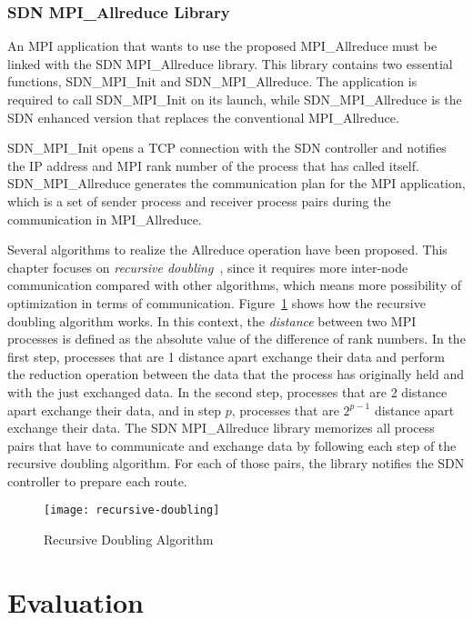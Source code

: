 \subsubsection{SDN MPI\_Allreduce Library}

An MPI application that wants to use the proposed MPI\_Allreduce must be
linked with the SDN MPI\_Allreduce library. This library contains two
essential functions, SDN\_MPI\_Init and SDN\_MPI\_Allreduce. The application
is required to call SDN\_MPI\_Init on its launch, while SDN\_MPI\_Allreduce is
the SDN enhanced version that replaces the conventional MPI\_Allreduce.

SDN\_MPI\_Init opens a TCP connection with the SDN controller and notifies the
IP address and MPI rank number of the process that has called itself.
SDN\_MPI\_Allreduce generates the communication plan for the MPI application,
which is a set of sender process and receiver process pairs during the
communication in MPI\_Allreduce.

Several algorithms to realize the Allreduce operation have been proposed. This
chapter focuses on \emph{recursive doubling}~\autocite{Thakur2005}, since it
requires more inter-node communication compared with other algorithms, which
means more possibility of optimization in terms of communication.
Figure~\ref{fig:recursive-doubling} shows how the recursive doubling algorithm
works. In this context, the \emph{distance} between two MPI processes is
defined as the absolute value of the difference of rank numbers. In the first
step, processes that are 1 distance apart exchange their data and perform the
reduction operation between the data that the process has originally held and
with the just exchanged data. In the second step, processes that are 2
distance apart exchange their data, and in step \(p\), processes that are
\(2^{p - 1}\) distance apart exchange their data. The SDN MPI\_Allreduce
library memorizes all process pairs that have to communicate and exchange data
by following each step of the recursive doubling algorithm. For each of those
pairs, the library notifies the SDN controller to prepare each route.

\begin{figure}
    \centering
    \texttt{[image: recursive-doubling]}
    \caption{Recursive Doubling Algorithm}%
    \label{fig:recursive-doubling}
\end{figure}

\section{Evaluation}\label{sec:iii-evaluation}

